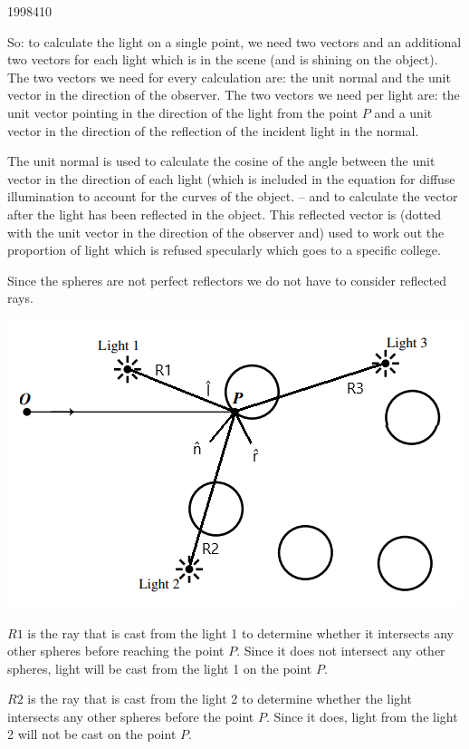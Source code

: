 \documentclass[10pt,\jkfside,a4paper]{article}
\begin{document}
\begin{enumerate}[label=(\alph*)]
\begin{examquestion}{1998}{4}{10}
\begin{enumerate}[label=(\alph*)]
So: to calculate the light on a single point, we need two vectors and an additional two vectors 
for each light which is in the scene (and is shining on the object).
The two vectors we need for every calculation are: the unit normal and the unit vector in the 
direction of the observer. The two vectors we need per light are: the unit vector pointing in the 
direction of the light from the point $P$ and a unit 
vector in the direction of the reflection of the incident light in the normal.

The unit normal is used to calculate the cosine of the angle between the unit vector in the 
direction of each light (which is included in the equation for diffuse illumination to account 
for the curves of the object. -- and to calculate the vector after the light has been reflected in the 
object. This reflected vector is (dotted with the unit vector in the direction of the observer and) 
used to work out the proportion of light which is refused specularly which goes to a specific 
college.

Since the spheres are not perfect reflectors we do not have to consider reflected rays.

\begin{center}
\includegraphics{diagram1998withrays}
\end{center}

$R1$ is the ray that is cast from the light 1 to determine whether it intersects any other spheres before reaching 
the point $P$. Since it does not intersect any other spheres, light will be cast from the light 1 on the point $P$.

$R2$ is the ray that is cast from the light 2 to determine whether the light intersects any other 
spheres before the point $P$. Since it does, light from the light 2 will not be cast on the point $P$.


\end{enumerate}
\end{examquestion}
\end{enumerate}
\end{document}
